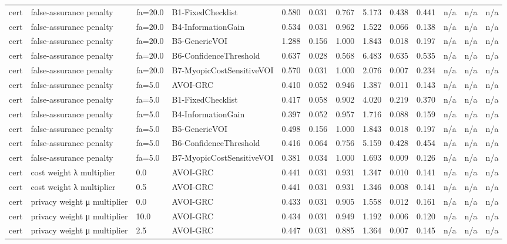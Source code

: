 \begin{table}[!ht]
{\begin{tabular}{lllllllllllll}
cert & false-assurance penalty & fa=20.0 & B1-FixedChecklist & 0.580 & 0.031 & 0.767 & 5.173 & 0.438 & 0.441 & n/a & n/a & n/a \\
cert & false-assurance penalty & fa=20.0 & B4-InformationGain & 0.534 & 0.031 & 0.962 & 1.522 & 0.066 & 0.138 & n/a & n/a & n/a \\
cert & false-assurance penalty & fa=20.0 & B5-GenericVOI & 1.288 & 0.156 & 1.000 & 1.843 & 0.018 & 0.197 & n/a & n/a & n/a \\
cert & false-assurance penalty & fa=20.0 & B6-ConfidenceThreshold & 0.637 & 0.028 & 0.568 & 6.483 & 0.635 & 0.535 & n/a & n/a & n/a \\
cert & false-assurance penalty & fa=20.0 & B7-MyopicCostSensitiveVOI & 0.570 & 0.031 & 1.000 & 2.076 & 0.007 & 0.234 & n/a & n/a & n/a \\
cert & false-assurance penalty & fa=5.0 & AVOI-GRC & 0.410 & 0.052 & 0.946 & 1.387 & 0.011 & 0.143 & n/a & n/a & n/a \\
cert & false-assurance penalty & fa=5.0 & B1-FixedChecklist & 0.417 & 0.058 & 0.902 & 4.020 & 0.219 & 0.370 & n/a & n/a & n/a \\
cert & false-assurance penalty & fa=5.0 & B4-InformationGain & 0.397 & 0.052 & 0.957 & 1.716 & 0.088 & 0.159 & n/a & n/a & n/a \\
cert & false-assurance penalty & fa=5.0 & B5-GenericVOI & 0.498 & 0.156 & 1.000 & 1.843 & 0.018 & 0.197 & n/a & n/a & n/a \\
cert & false-assurance penalty & fa=5.0 & B6-ConfidenceThreshold & 0.416 & 0.064 & 0.756 & 5.159 & 0.428 & 0.454 & n/a & n/a & n/a \\
cert & false-assurance penalty & fa=5.0 & B7-MyopicCostSensitiveVOI & 0.381 & 0.034 & 1.000 & 1.693 & 0.009 & 0.126 & n/a & n/a & n/a \\
cert & cost weight λ multiplier & 0.0 & AVOI-GRC & 0.441 & 0.031 & 0.931 & 1.347 & 0.010 & 0.141 & n/a & n/a & n/a \\
cert & cost weight λ multiplier & 0.5 & AVOI-GRC & 0.441 & 0.031 & 0.931 & 1.346 & 0.008 & 0.141 & n/a & n/a & n/a \\
cert & privacy weight μ multiplier & 0.0 & AVOI-GRC & 0.433 & 0.031 & 0.905 & 1.558 & 0.012 & 0.161 & n/a & n/a & n/a \\
cert & privacy weight μ multiplier & 10.0 & AVOI-GRC & 0.434 & 0.031 & 0.949 & 1.192 & 0.006 & 0.120 & n/a & n/a & n/a \\
cert & privacy weight μ multiplier & 2.5 & AVOI-GRC & 0.447 & 0.031 & 0.885 & 1.364 & 0.007 & 0.145 & n/a & n/a & n/a \\

\end{tabular}}
\end{table}
